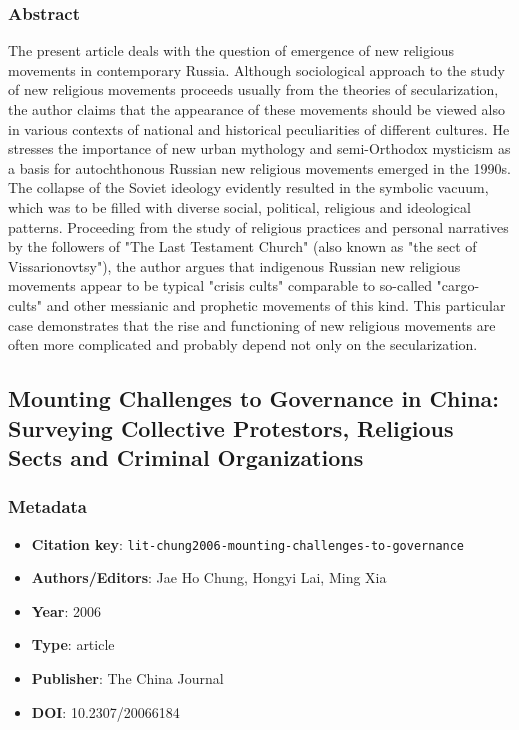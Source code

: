 \subsubsection*{Abstract}
The present article deals with the question of emergence of new religious movements in contemporary Russia. Although sociological approach to the study of new religious movements proceeds usually from the theories of secularization, the author claims that the appearance of these movements should be viewed also in various contexts of national and historical peculiarities of different cultures. He stresses the importance of new urban mythology and semi-Orthodox mysticism as a basis for autochthonous Russian new religious movements emerged in the 1990s. The collapse of the Soviet ideology evidently resulted in the symbolic vacuum, which was to be filled with diverse social, political, religious and ideological patterns. Proceeding from the study of religious practices and personal narratives by the followers of "The Last Testament Church" (also known as "the sect of Vissarionovtsy"), the author argues that indigenous Russian new religious movements appear to be typical "crisis cults" comparable to so-called "cargo-cults" and other messianic and prophetic movements of this kind. This particular case demonstrates that the rise and functioning of new religious movements are often more complicated and probably depend not only on the secularization.

\subsection{Mounting Challenges to Governance in China: Surveying Collective Protestors, Religious Sects and Criminal Organizations}\label{lit:lit-chung2006-mounting-challenges-to-governance}
\subsubsection*{Metadata}
\begin{itemize}
  \item \textbf{Citation key}: \texttt{lit-chung2006-mounting-challenges-to-governance}
  \item \textbf{Authors/Editors}: Jae Ho Chung, Hongyi Lai, Ming Xia
  \item \textbf{Year}: 2006
  \item \textbf{Type}: article
  \item \textbf{Publisher}: The China Journal
  \item \textbf{DOI}: 10.2307/20066184
\end{itemize}
